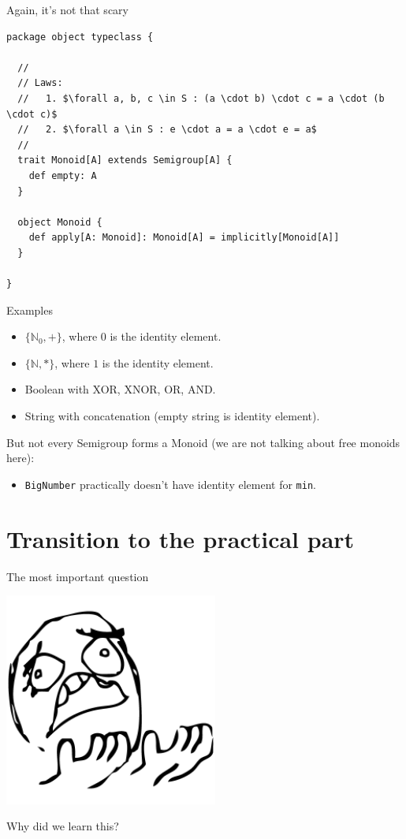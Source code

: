 \documentclass[presentation,aspectratio=169,smaller]{beamer}
\begin{document}
\begin{frame}[label={sec:orgedbf3c8},fragile]{Again, it's not that scary}
 \begin{verbatim}
package object typeclass {

  //
  // Laws:
  //   1. $\forall a, b, c \in S : (a \cdot b) \cdot c = a \cdot (b \cdot c)$
  //   2. $\forall a \in S : e \cdot a = a \cdot e = a$
  //
  trait Monoid[A] extends Semigroup[A] {
    def empty: A
  }

  object Monoid {
    def apply[A: Monoid]: Monoid[A] = implicitly[Monoid[A]]
  }

}
\end{verbatim}
\end{frame}

\begin{frame}[label={sec:orgd35a6ea},fragile]{Examples}
 \begin{itemize}
\item \(\{\mathbb{N}_0, +\}\), where \(0\) is the identity element.
\item \(\{\mathbb{N}, *\}\), where \(1\) is the identity element.
\item Boolean with XOR, XNOR, OR, AND.
\item String with concatenation (empty string is identity element).
\end{itemize}

But not every Semigroup forms a Monoid (we are not talking about free monoids
here):

\begin{itemize}
\item \texttt{BigNumber} practically doesn’t have identity element for \texttt{min}.
\end{itemize}
\end{frame}

\section*{Transition to the practical part}
\label{sec:org3c1ecaf}

\begin{frame}[label={sec:orgfbd8726}]{The most important question}
\begin{center}
\includegraphics[height=7cm]{images/whyyy.png}
\end{center}

Why did we learn this?
\end{frame}
\end{document}
